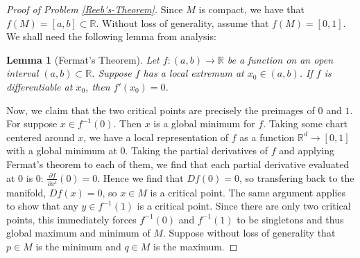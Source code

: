 \documentclass[reqno]{amsart}
\newtheorem{lemma}[theorem]{Lemma}
\theoremstyle{definition}
\theoremstyle{remark}
\begin{document}
    \begin{proof}[Proof of Problem \ref{Reeb's-Theorem}]
        Since $M$ is compact,
        we have that
        $f(M) = \left[ a,b \right] \subset \mathbb{R}$.
        Without loss of generality, assume that
        $f(M) = \left[ 0,1 \right] $.\\

        We shall need the following lemma from
        analysis:
        \begin{lemma}[Fermat's Theorem]
            Let $f \colon \left( a,b \right) \to \mathbb{R}$ 
            be a function on an open interval
            $\left( a,b \right) \subset \mathbb{R}$.
            Suppose $f$ has a local extremum at
            $x_0 \in (a,b)$. If
            $f$ is differentiable at $x_0$, then
            $f'(x_0) = 0$.
        \end{lemma}

        Now, we claim that
        the two critical points are precisely the preimages
        of $0$ and $1$.
        For suppose
        $x \in f^{-1}(0)$.
        Then $x$ is a global minimum for $f$.
        Taking some chart centered around $x$, we have a local
        representation
        of $f$ as a function $\mathbb{R}^{d} \to 
        \left[ 0,1 \right] $ 
        with a global minimum at $0$.
        Taking the partial derivatives of
        $f$ and applying Fermat's theorem to each of them,
        we find that each partial derivative evaluated at $0$ 
        is $0$: $\frac{\partial f}{\partial x^{i}}(0) = 0$.
        Hence we find that
        $Df(0) = 0$, so transfering back to the manifold,
        $Df(x) = 0$, so $x \in M$ is a critical point.
        The same argument applies to show that
        any $y \in f^{-1}(1)$ is a critical point.
        Since there are only two critical points, this
        immediately forces
        $f^{-1}(0)$ and $f^{-1}(1)$ to be singletons
        and thus global maximum and minimum of $M$.
        Suppose without loss of generality that
        $p \in M$ is the minimum and
        $q \in M$ is the maximum.


\end{proof}
\end{document}
